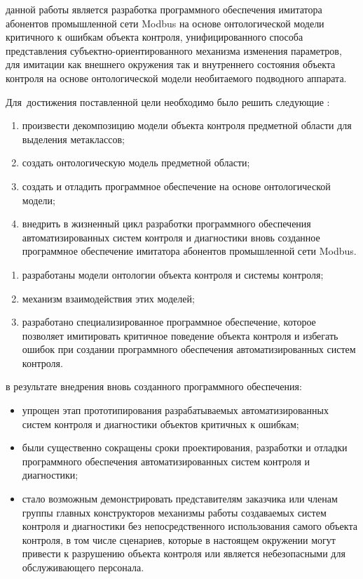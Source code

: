 {\aim} данной работы является разработка программного обеспечения 
  имитатора абонентов промышленной сети Modbus на основе онтологической модели критичного к ошибкам объекта контроля,
  унифицированного способа представления субъектно-ориентированного механизма
  изменения параметров, для имитации как внешнего окружения так и внутреннего состояния объекта контроля на основе онтологической модели 
  необитаемого подводного аппарата.


Для~достижения поставленной цели необходимо было решить следующие {\tasks}:
\begin{enumerate}
  \item произвести декомпозицию модели объекта контроля предметной области для выделения метаклассов;
  \item создать онтологическую модель предметной области;
  \item создать и отладить программное обеспечение на основе онтологической модели;
  \item внедрить в жизненный цикл разработки программного обеспечения автоматизированных систем контроля и диагностики
        вновь созданное программное обеспечение имитатора абонентов промышленной сети Modbus.
\end{enumerate}


{\novelty}
\begin{enumerate}
  \item разработаны модели онтологии объекта контроля и системы контроля;
  \item механизм взаимодействия этих моделей;
  \item разработано специализированное программное обеспечение, которое позволяет имитировать критичное поведение объекта контроля 
        и избегать ошибок при создании программного обеспечения автоматизированных систем контроля.
\end{enumerate}

{\influence} в результате внедрения вновь созданного программного обеспечения:
\begin{itemize}
  \item упрощен этап прототипирования разрабатываемых автоматизированных систем контроля и диагностики объектов критичных к ошибкам;
  \item были существенно сокращены сроки проектирования, разработки и отладки программного обеспечения автоматизированных систем контроля и диагностики;
  \item стало возможным демонстрировать представителям заказчика или членам группы главных конструкторов механизмы работы создаваемых систем контроля 
      и диагностики без непосредственного использования самого объекта контроля, в том числе сценариев, которые в настоящем окружении могут привести к разрушению
      объекта контроля или является небезопасными для обслуживающего персонала.
\end{itemize}

